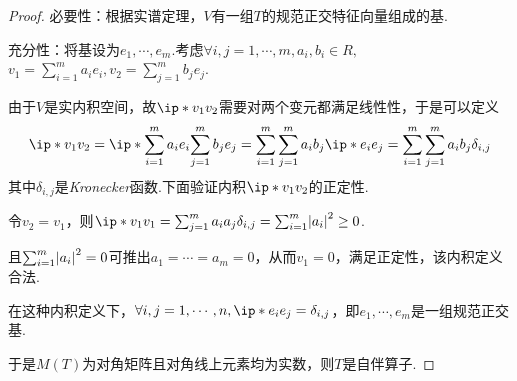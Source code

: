 \begin{proof}
    必要性：根据实谱定理，\(V\)有一组\(T\)的规范正交特征向量组成的基.

    充分性：将基设为\(e_1,\cdots,e_m\).考虑\(\forall i,j=1,\cdots,m,a_i,b_i \in R,\)
    \(v_1=\sum_{i=1}^m a_ie_i,v_2=\sum_{j=1}^m b_je_j\).
    
    由于\(V\)是实内积空间，故\(\ip*{v_1}{v_2}\)需要对两个变元都满足线性性，于是可以定义
    \begin{align*}
        \ip*{v_1}{v_2}=\ip*{\sum_{i=1}^m a_ie_i}{\sum_{j=1}^m b_je_j}=
        \sum_{i=1}^m \sum_{j=1}^m a_ib_j \ip*{e_i}{e_j}=\sum_{i=1}^m \sum_{j=1}^m a_ib_j\delta_{i,j}
    \end{align*}
    其中\(\delta_{i,j}\)是\textit{Kronecker}函数.下面验证内积\(\ip*{v_1}{v_2}\)的正定性.
    
    令\(v_2=v_1\)，则\(\ip*{v_1}{v_1}=\sum_{j=1}^m a_ia_j\delta_{i,j}=\sum_{i=1}^m \abs*{a_i}^2 \geq 0\).
    
    且\(\sum_{i=1}^m \abs*{a_i}^2=0\)可推出\(a_1=\cdots=a_m=0\)，从而\(v_1=0\)，满足正定性，该内积定义合法.
    
    在这种内积定义下，\(\forall i,j=1,\cdots,n,\ip*{e_i}{e_j}=\delta_{i,j}\)，即\(e_1,\cdots,e_m\)是一组规范正交基.
    
    于是\(M(T)\)为对角矩阵且对角线上元素均为实数，则\(T\)是自伴算子.
\end{proof}

